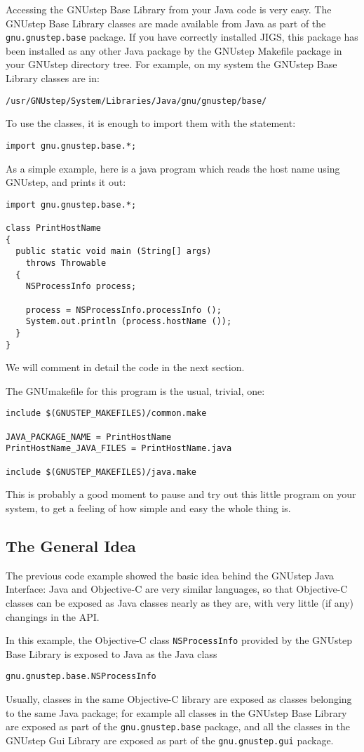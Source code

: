 Accessing the GNUstep Base Library from your Java code is very easy.
The GNUstep Base Library classes are made available from Java as part
of the \texttt{gnu.gnustep.base} package.  If you have correctly
installed JIGS, this package has been installed as any other Java
package by the GNUstep Makefile package in your GNUstep directory
tree.  For example, on my system the GNUstep Base Library classes are
in:
\begin{verbatim}
/usr/GNUstep/System/Libraries/Java/gnu/gnustep/base/
\end{verbatim}
To use the classes, it is enough to import them with the statement:
\begin{verbatim}
import gnu.gnustep.base.*;
\end{verbatim}

As a simple example, here is a java program which reads the host name
using GNUstep, and prints it out:
\begin{verbatim}
import gnu.gnustep.base.*;

class PrintHostName
{ 
  public static void main (String[] args) 
    throws Throwable
  {
    NSProcessInfo process;

    process = NSProcessInfo.processInfo ();
    System.out.println (process.hostName ());
  }
}
\end{verbatim}
We will comment in detail the code in the next section.

The GNUmakefile for this program is the usual, trivial, one:
\begin{verbatim}
include $(GNUSTEP_MAKEFILES)/common.make

JAVA_PACKAGE_NAME = PrintHostName
PrintHostName_JAVA_FILES = PrintHostName.java

include $(GNUSTEP_MAKEFILES)/java.make
\end{verbatim}
This is probably a good moment to pause and try out this little
program on your system, to get a feeling of how simple and easy the
whole thing is.

\subsection{The General Idea}
The previous code example showed the basic idea behind the GNUstep
Java Interface: Java and Objective-C are very similar languages, so
that Objective-C classes can be exposed as Java classes nearly as they
are, with very little (if any) changings in the API.

In this example, the Objective-C class \texttt{NSProcessInfo} provided
by the GNUstep Base Library is exposed to Java as the Java class
\begin{verbatim}
gnu.gnustep.base.NSProcessInfo
\end{verbatim}
Usually, classes in the same Objective-C library are exposed as
classes belonging to the same Java package; for example all classes in
the GNUstep Base Library are exposed as part of the
\texttt{gnu.gnustep.base} package, and all the classes in the GNUstep 
Gui Library are exposed as part of the \texttt{gnu.gnustep.gui}
package.

